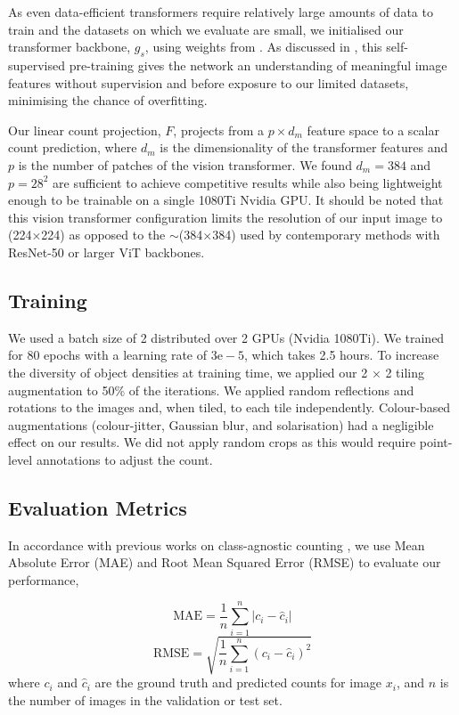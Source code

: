 \documentclass[../thesis.tex]{subfiles}
\begin{document}
As even data-efficient transformers require relatively large amounts of data to train and the datasets on which we evaluate are small, we initialised our transformer backbone, $g_s$, using weights from \citet{caron2021DINO}. As discussed in , this self-supervised pre-training gives the network an understanding of meaningful image features without supervision and before exposure to our limited datasets, minimising the chance of overfitting. 

Our linear count projection, $F$, projects from a $p\times d_m$ feature space to a scalar count prediction, where $d_m$ is the dimensionality of the transformer features and $p$ is the number of patches of the vision transformer. We found $d_m = 384$ and $p = 28^2$ are sufficient to achieve competitive results while also being lightweight enough to be trainable on a single 1080Ti Nvidia GPU. It should be noted that this vision transformer configuration limits the resolution of our input image to (224$\times$224) as opposed to the $\sim$(384$\times$384) used by contemporary methods with ResNet-50 or larger ViT backbones.

\subsection{Training}
\label{LTCA__sec__experiments_training}
We used a batch size of 2 distributed over 2 GPUs (Nvidia 1080Ti). We trained for 80 epochs with a learning rate of $3\mathrm{e}-5$, which takes 2.5 hours.
To increase the diversity of object densities 
at training time, we applied our 2 × 2 tiling augmentation to 50\% of the iterations.
We applied random reflections and rotations to the images and, when tiled, to each tile independently. Colour-based augmentations (colour-jitter, Gaussian blur, and solarisation) had a negligible effect on our results. We did not apply random crops as this would require point-level annotations to adjust the count. 

\subsection{Evaluation Metrics}
\label{LTCA__sec__experiments_evaluationmetrics}
In accordance with previous works on class-agnostic counting \cite{shi2022represent, ranjan2022exemplar}, we use Mean Absolute Error (MAE) and Root Mean Squared Error (RMSE) to evaluate our performance, 

\begin{equation}
    \text{MAE} = \frac{1}{n}\sum_{i=1}^{n} |c_i - \hat{c}_i|
\end{equation}
\begin{equation}
    \text{RMSE} = \sqrt{\frac{1}{n}\sum_{i=1}^{n} (c_i - \hat{c}_i)^2}
\end{equation}
where $c_i$ and $\hat{c}_i$ are the ground truth and predicted counts for image $x_i$, and $n$ is the number of images in the validation or test set.
\end{document}
